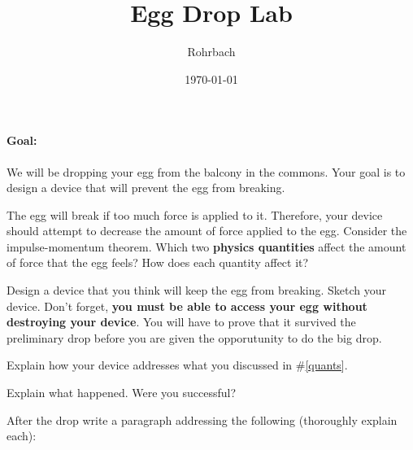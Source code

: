 \documentclass[10pt]{exam}
\title{Egg Drop Lab}
\author{Rohrbach}
\date{\today}
\begin{document}
\maketitle

\paragraph{Goal:} 
  We will be dropping your egg from the balcony in the commons.  Your goal is to design a device that will prevent the egg from breaking.

\begin{questions}
  
    \question \label{quants}
      The egg will break if too much force is applied to it.  Therefore, your device should attempt to decrease the amount of force applied to the egg.  Consider the impulse-momentum theorem.  Which two {\bf physics quantities} affect the amount of force that the egg feels?  How does each quantity affect it?
      \vs
    
    \question
      Design a device that you think will keep the egg from breaking.  Sketch your device.  Don't forget, {\bf you must be able to access your egg without destroying your device}.  You will have to prove that it survived the preliminary drop before you are given the opporutunity to do the big drop.
      \vs[2]
    
    \question
      Explain how your device addresses what you discussed in \#\ref{quants}.
      \vs

  \pagebreak
  
  
  
    \question
      Explain what happened.  Were you successful?
      \vspace{8em}
  
  
  
    \question
  
      After the drop write a paragraph addressing the following (thoroughly explain each):


\end{questions}
\end{document}
